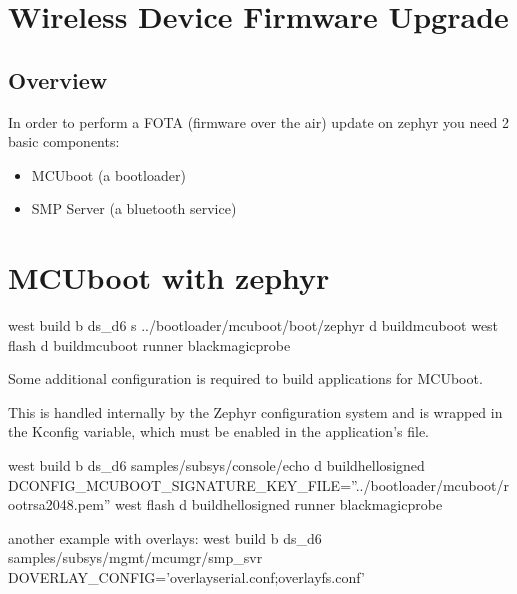 \documentclass[letterpaper,10pt,english]{sphinxmanual}
\begin{document}
\section{Wireless Device Firmware Upgrade}
\label{\detokenize{fota/mcuboot:wireless-device-firmware-upgrade}}

\subsection{Overview}
\label{\detokenize{fota/mcuboot:overview}}
In order to perform a FOTA (firmware over the air) update on zephyr you need 2 basic components:
\begin{itemize}
\item {} 
MCUboot   (a bootloader)

\item {} 
SMP Server (a bluetooth service)

\end{itemize}


\section{MCUboot with zephyr}
\label{\detokenize{fota/mcuboot:mcuboot-with-zephyr}}\label{\detokenize{fota/mcuboot:id1}}
west build \sphinxhyphen{}b ds\_d6 \sphinxhyphen{}s ../bootloader/mcuboot/boot/zephyr \sphinxhyphen{}d build\sphinxhyphen{}mcuboot
west flash \sphinxhyphen{}d build\sphinxhyphen{}mcuboot \textendash{}runner blackmagicprobe

Some additional configuration is required to build applications for MCUboot.

This is handled internally by the Zephyr configuration system and is wrapped
in the  Kconfig variable, which must be enabled in
the application’s  file.

west build \sphinxhyphen{}b ds\_d6 samples/subsys/console/echo \sphinxhyphen{}d build\sphinxhyphen{}hello\sphinxhyphen{}signed \sphinxhyphen{}DCONFIG\_MCUBOOT\_SIGNATURE\_KEY\_FILE=”../bootloader/mcuboot/root\sphinxhyphen{}rsa\sphinxhyphen{}2048.pem”
west flash \sphinxhyphen{}d build\sphinxhyphen{}hello\sphinxhyphen{}signed \textendash{}runner blackmagicprobe

another example with overlays:
west build \sphinxhyphen{}b ds\_d6 samples/subsys/mgmt/mcumgr/smp\_svr \textendash{} \sphinxhyphen{}DOVERLAY\_CONFIG=’overlay\sphinxhyphen{}serial.conf;overlay\sphinxhyphen{}fs.conf’
\end{document}
